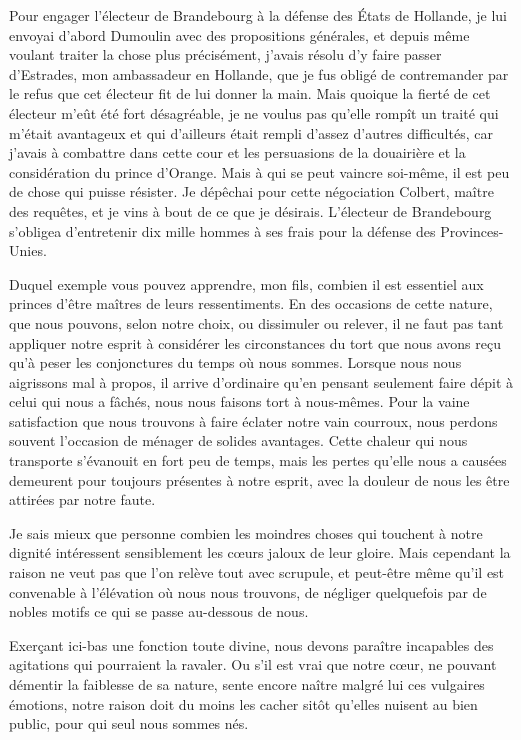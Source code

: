 \documentclass[french,twoside]{book} %
\begin{document}
Pour engager l’électeur de Brandebourg à la défense des États de Hollande, je lui envoyai d’abord Dumoulin avec des propositions générales, et depuis même voulant traiter la chose plus précisément, j’avais résolu d’y faire passer d’Estrades, mon ambassadeur en Hollande, que je fus obligé de contremander par le refus que cet électeur fit de lui donner la main. Mais quoique la fierté de cet électeur m’eût été fort désagréable, je ne voulus pas qu’elle rompît un traité qui m’était avantageux et qui d’ailleurs était rempli d’assez d’autres difficultés, car j’avais à combattre dans cette cour et les persuasions de la douairière et la considération du prince d’Orange. Mais à qui se peut vaincre soi-même, il est peu de chose qui puisse résister. Je dépêchai pour cette négociation Colbert, maître des requêtes, et je vins à bout de ce que je désirais. L’électeur de Brandebourg s’obligea d’entretenir dix mille hommes à ses frais pour la défense des Provinces-Unies.\par
Duquel exemple vous pouvez apprendre, mon fils, combien il est essentiel aux princes d’être maîtres de leurs ressentiments. En des occasions de cette nature, que nous pouvons, selon notre choix, ou dissimuler ou relever, il ne faut pas tant appliquer notre esprit à considérer les circonstances du tort que nous avons reçu qu’à peser les conjonctures du temps où nous sommes. Lorsque nous nous aigrissons mal à propos, il arrive d’ordinaire qu’en pensant seulement faire dépit à celui qui nous a fâchés, nous nous faisons tort à nous-mêmes. Pour la vaine satisfaction que nous trouvons à faire éclater notre vain courroux, nous perdons souvent l’occasion de ménager de solides avantages. Cette chaleur qui nous transporte s’évanouit en fort peu de temps, mais les pertes qu’elle nous a causées demeurent pour toujours présentes à notre esprit, avec la douleur de nous les être attirées par notre faute.\par
Je sais mieux que personne combien les moindres choses qui touchent à notre dignité intéressent sensiblement les cœurs jaloux de leur gloire. Mais cependant la raison ne veut pas que l’on relève tout avec scrupule, et peut-être même qu’il est convenable à l’élévation où nous nous trouvons, de négliger quelquefois par de nobles motifs ce qui se passe au-dessous de nous.\par
Exerçant ici-bas une fonction toute divine, nous devons paraître incapables des agitations qui pourraient la ravaler. Ou s’il est vrai que notre cœur, ne pouvant démentir la faiblesse de sa nature, sente encore naître malgré lui ces vulgaires émotions, notre raison doit du moins les cacher sitôt qu’elles nuisent au bien public, pour qui seul nous sommes nés.\par
\end{document}
